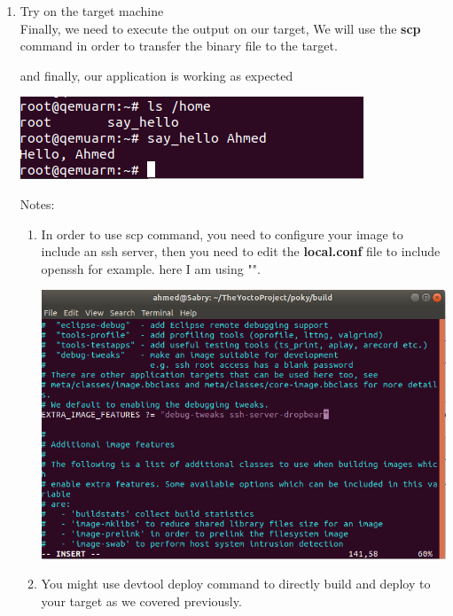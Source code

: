 \documentclass{article}
\begin{document}
\begin{enumerate}
\begin{enumerate}
    

    \item Try on the target machine\\
    Finally, we need to execute the output on our target, We will use the \textbf{scp} command in order to transfer the binary file to the target.
    

    and finally, our application is working as expected
    \begin{center}
      \includegraphics[scale=0.6]{./resources/img/std_sdk_scp.png}
    \end{center}

    Notes: 
    \begin{enumerate}
      \item In order to use scp command, you need to configure your image to include an ssh server, then you need to edit the \textbf{local.conf} file to include openssh for example. here I am using "".
      \begin{center}
        \includegraphics[scale=0.6]{./resources/img/image_features-add-ssh-dropbear.png}
      \end{center}

      \item You might use devtool deploy command to directly build and deploy to your target as we covered previously.
    \end{enumerate}


\end{enumerate}
\end{enumerate}
\end{document}
